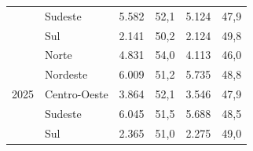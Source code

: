 \documentclass[12pt,a4paper,header]{abnt}
\begin{document}
\begin{table}[ht]
\begin{tabular}{llrrrr}
                      & Sudeste      & 5.582 & 52,1 & 5.124 & 47,9 \\
                      & Sul          & 2.141 & 50,2 & 2.124 & 49,8 \\
\midrule
\multirow{5}{*}{2025} & Norte        & 4.831 & 54,0 & 4.113 & 46,0 \\
                      & Nordeste     & 6.009 & 51,2 & 5.735 & 48,8 \\
                      & Centro-Oeste & 3.864 & 52,1 & 3.546 & 47,9 \\
                      & Sudeste      & 6.045 & 51,5 & 5.688 & 48,5 \\
                      & Sul          & 2.365 & 51,0 & 2.275 & 49,0 \\
\bottomrule
\end{tabular}
\end{table}
\end{document}

